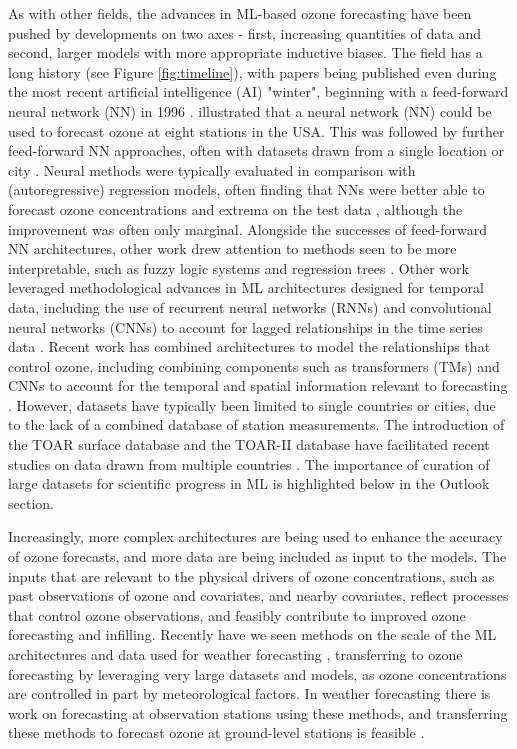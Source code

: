 \documentclass[gmd, manuscript]{copernicus}
\begin{document}
As with other fields, the advances in ML-based ozone forecasting have been pushed by developments on two axes - first, increasing quantities of data and second, larger models with more appropriate inductive biases. The field has a long history (see Figure \ref{fig:timeline}), with papers being published even during the most recent artificial intelligence (AI) "winter", beginning with a feed-forward neural network (NN) in 1996 \citep{Yi1996}. \citet{Comrie1997} illustrated that a neural network (NN) could be used to forecast ozone at eight stations in the USA. This was followed by further feed-forward NN approaches, often with datasets drawn from a single location or city \citep{cobourn_comparison_2000, Kolehmainen2001}. Neural methods were typically evaluated in comparison with (autoregressive) regression models, often finding that NNs were better able to forecast ozone concentrations and extrema on the test data \cite{Nunnari1998, Schlink2003, Chaloulakou2003}, although the improvement was often only marginal. Alongside the successes of feed-forward NN architectures, other work drew attention to methods seen to be more interpretable, such as fuzzy logic systems and regression trees \citep{Gardner2000, Heo2004}. Other work leveraged methodological advances in ML architectures designed for temporal data, including the use of recurrent neural networks (RNNs) and convolutional neural networks (CNNs) to account for lagged relationships in the time series data \citep{Eslami2020, sayeed_novel_2021, Kleinert2021}. Recent work has combined architectures to model the relationships that control ozone, including combining components such as transformers (TMs) and CNNs to account for the temporal and spatial information relevant to forecasting \citep{Chen2022, Cheng2022, Han2023}. However, datasets have typically been limited to single countries or cities, due to the lack of a combined database of station measurements. The introduction of the TOAR surface database \citep{Schultz2017} and the TOAR-II database have facilitated recent studies on data drawn from multiple countries \citep{leufen_o3resnet_2023, Hickman2023}. The importance of curation of large datasets for scientific progress in ML is highlighted below in the Outlook section. 

Increasingly, more complex architectures are being used to enhance the accuracy of ozone forecasts, and more data are being included as input to the models. The inputs that are relevant to the physical drivers of ozone concentrations, such as past observations of ozone and covariates, and nearby covariates, reflect processes that control ozone observations, and feasibly contribute to improved ozone forecasting and infilling. Recently have we seen methods on the scale of the ML architectures and data used for weather forecasting \citep{bi_accurate_2023, lam_learning_2023}, transferring to ozone forecasting by leveraging very large datasets and models, as ozone concentrations are controlled in part by meteorological factors. In weather forecasting there is work on forecasting at observation stations using these methods, and transferring these methods to forecast ozone at ground-level stations is feasible \citep{Manshausen2024}. 
\end{document}
